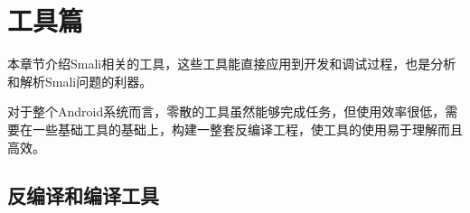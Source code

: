 \chapter{工具篇}
本章节介绍Smali相关的工具，这些工具能直接应用到开发和调试过程，也是分析和解析Smali问题的利器。

对于整个Android系统而言，零散的工具虽然能够完成任务，但使用效率很低，需要在一些基础工具的基础上，构建一整套反编译工程，使工具的使用易于理解而且高效。

\section{反编译和编译工具}